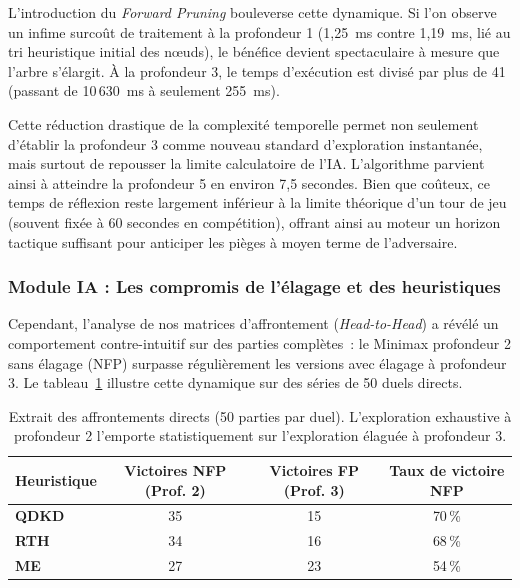 \documentclass[a4paper]{article}
\begin{document}
L'introduction du \textit{Forward Pruning} bouleverse cette dynamique. Si l'on observe un infime surcoût de traitement à la profondeur 1 (1,25~ms contre 1,19~ms, lié au tri heuristique initial des nœuds), le bénéfice devient spectaculaire à mesure que l'arbre s'élargit. À la profondeur 3, le temps d'exécution est divisé par plus de 41 (passant de 10\,630~ms à seulement 255~ms). 

Cette réduction drastique de la complexité temporelle permet non seulement d'établir la profondeur 3 comme nouveau standard d'exploration instantanée, mais surtout de repousser la limite calculatoire de l'IA. L'algorithme parvient ainsi à atteindre la profondeur 5 en environ 7,5 secondes. Bien que coûteux, ce temps de réflexion reste largement inférieur à la limite théorique d'un tour de jeu (souvent fixée à 60 secondes en compétition), offrant ainsi au moteur un horizon tactique suffisant pour anticiper les pièges à moyen terme de l'adversaire.
\newpage
\subsubsection{Module IA : Les compromis de l'élagage et des heuristiques}

Cependant, l'analyse de nos matrices d'affrontement (\textit{Head-to-Head}) a révélé un comportement contre-intuitif sur des parties complètes~: le Minimax profondeur 2 sans élagage (NFP) surpasse régulièrement les versions avec élagage à profondeur 3. Le tableau~\ref{tab:pruning_h2h} illustre cette dynamique sur des séries de 50 duels directs.

\begin{table}[H]
    \centering
    \begin{tabular}{lccc}
        \toprule
        \textbf{Heuristique} & \textbf{Victoires NFP (Prof. 2)} & \textbf{Victoires FP (Prof. 3)} & \textbf{Taux de victoire NFP} \\
        \midrule
        \textbf{QDKD} & 35 & 15 & 70\,\% \\
        \textbf{RTH}  & 34 & 16 & 68\,\% \\
        \textbf{ME}   & 27 & 23 & 54\,\% \\
        \bottomrule
    \end{tabular}
    \caption{Extrait des affrontements directs (50 parties par duel). L'exploration exhaustive à profondeur 2 l'emporte statistiquement sur l'exploration élaguée à profondeur 3.}
    \label{tab:pruning_h2h}
\end{table}
\end{document}
